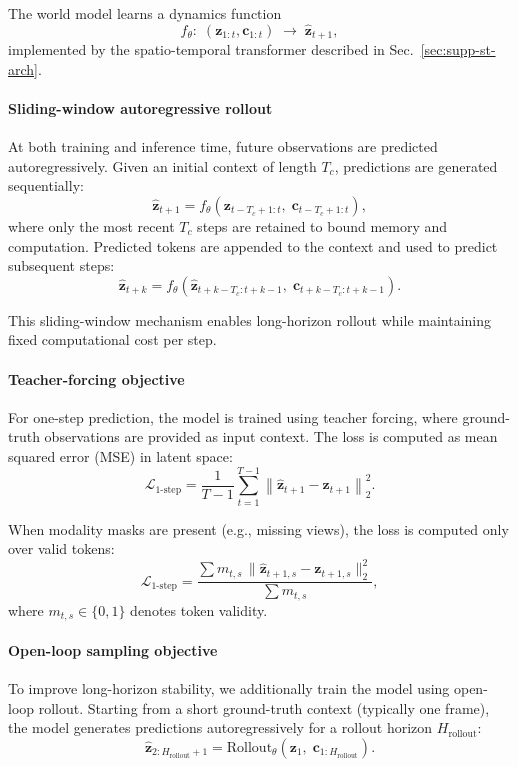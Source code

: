 The world model learns a dynamics function
\[
f_\theta:\; (\mathbf{z}_{1:t}, \mathbf{c}_{1:t}) \;\rightarrow\; \hat{\mathbf{z}}_{t+1},
\]
implemented by the spatio-temporal transformer described in Sec.~\ref{sec:supp-st-arch}.

\paragraph{Sliding-window autoregressive rollout}
At both training and inference time, future observations are predicted autoregressively. Given an initial context of length $T_c$, predictions are generated sequentially:
\[
\hat{\mathbf{z}}_{t+1} = f_\theta(\mathbf{z}_{t-T_c+1:t},\; \mathbf{c}_{t-T_c+1:t}),
\]
where only the most recent $T_c$ steps are retained to bound memory and computation. Predicted tokens are appended to the context and used to predict subsequent steps:
\[
\hat{\mathbf{z}}_{t+k} = f_\theta(\hat{\mathbf{z}}_{t+k-T_c:t+k-1},\; \mathbf{c}_{t+k-T_c:t+k-1}).
\]

This sliding-window mechanism enables long-horizon rollout while maintaining fixed computational cost per step.

\paragraph{Teacher-forcing objective}
For one-step prediction, the model is trained using teacher forcing, where ground-truth observations are provided as input context. The loss is computed as mean squared error (MSE) in latent space:
\[
\mathcal{L}_{\text{1-step}}
= \frac{1}{T-1} \sum_{t=1}^{T-1}
\left\| \hat{\mathbf{z}}_{t+1} - \mathbf{z}_{t+1} \right\|_2^2.
\]

When modality masks are present (e.g., missing views), the loss is computed only over valid tokens:
\[
\mathcal{L}_{\text{1-step}}
= \frac{\sum m_{t,s}\,
\|\hat{\mathbf{z}}_{t+1,s} - \mathbf{z}_{t+1,s}\|_2^2}
{\sum m_{t,s}},
\]
where $m_{t,s}\in\{0,1\}$ denotes token validity.

\paragraph{Open-loop sampling objective}
To improve long-horizon stability, we additionally train the model using open-loop rollout. Starting from a short ground-truth context (typically one frame), the model generates predictions autoregressively for a rollout horizon $H_{\text{rollout}}$:
\[
\hat{\mathbf{z}}_{2:H_{\text{rollout}}+1}
=
\text{Rollout}_\theta
\!\left(
\mathbf{z}_1,\;
\mathbf{c}_{1:H_{\text{rollout}}}
\right).
\]


